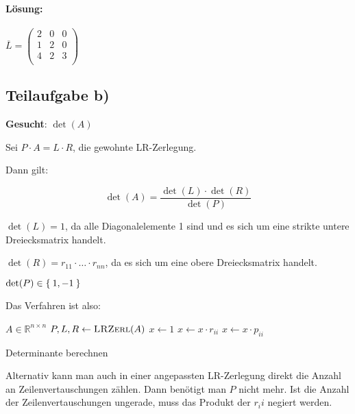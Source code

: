\paragraph{Lösung:}
$
\overline{L} =
\begin{pmatrix}
2 & 0 & 0 \\
1 & 2 & 0 \\
4 & 2 & 3 \\
\end{pmatrix}
$


\subsection*{Teilaufgabe b)}
\textbf{Gesucht}: $\det(A)$

Sei $P \cdot A = L \cdot R$, die gewohnte LR-Zerlegung.

Dann gilt:

\[\det(A) = \frac{\det(L) \cdot \det(R)}{\det(P)}\]

$\det(L) = 1$, da alle Diagonalelemente 1 sind und es sich um eine strikte untere Dreiecksmatrix handelt.

$\det(R) = r_{11} \cdot \ldots \cdot r_{nn}$, da es sich um eine obere Dreiecksmatrix handelt.


$\det(P) \in \Set{1, -1}$

Das Verfahren ist also:

\begin{algorithm}[H]
    \begin{algorithmic}
        \Require $A \in \mathbb{R}^{n \times n}$
        \State $P, L, R \gets \Call{LRZerl}{A}$
        \State $x \gets 1$
            \State $x \gets x \cdot r_{ii}$
            \State $x \gets x \cdot p_{ii}$
        \EndFor
    \end{algorithmic}
\caption{Determinante berechnen}
\label{alg:seq1}
\end{algorithm}

Alternativ kann man auch in einer angepassten LR-Zerlegung direkt die
Anzahl an Zeilenvertauschungen zählen. Dann benötigt man $P$ nicht mehr.
Ist die Anzahl der Zeilenvertauschungen ungerade, muss das Produkt
der $r_ii$ negiert werden.
